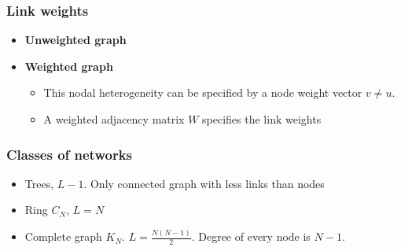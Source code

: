 \subsubsection{Link weights}
\begin{itemize}
  \item \textbf{Unweighted graph}
  \item \textbf{Weighted graph}
  \begin{itemize}
    \item This nodal heterogeneity can be specified by a node weight vector $v \ne u$.
    \item A weighted adjacency matrix $W$ specifies the link weights
  \end{itemize}
\end{itemize}

\subsubsection{Classes of networks}
\begin{itemize}
  \item Trees, $L- 1$. Only connected graph with less links than nodes
  \item Ring $C_N$, $L=N$
  \item Complete graph $K_N$. $L=\frac{N(N-1)}{2}$. Degree of every node is $N-1$.
\end{itemize}

